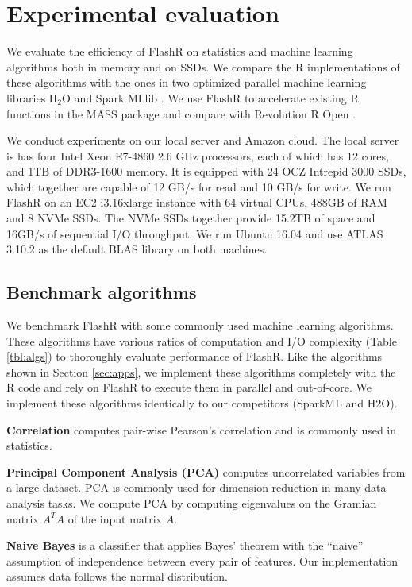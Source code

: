 \section{Experimental evaluation}
We evaluate the efficiency of FlashR on statistics and machine learning
algorithms both in memory and on SSDs. We compare the R implementations of
these algorithms with the ones in two optimized parallel machine learning
libraries H$_2$O \cite{h2o} and Spark MLlib \cite{mllib}. We use FlashR
to accelerate existing R functions in the MASS package and compare with
Revolution R Open \cite{rro}.

We conduct experiments on our local server and Amazon cloud. The local server
is has four Intel Xeon E7-4860 2.6 GHz processors,
each of which has 12 cores, and 1TB of DDR3-1600 memory. It is equipped
with 24 OCZ Intrepid 3000 SSDs, which together are capable of 12 GB/s for read
and 10 GB/s for write. We run FlashR on an EC2 i3.16xlarge instance
with 64 virtual CPUs, 488GB of RAM and 8 NVMe SSDs. The NVMe SSDs together
provide 15.2TB of space and 16GB/s of sequential I/O throughput.
We run Ubuntu 16.04 and use ATLAS 3.10.2 as the default BLAS library on both
machines.

\subsection{Benchmark algorithms}\label{benchalg}
We benchmark FlashR with some commonly used machine learning algorithms.
These algorithms have various ratios of computation and I/O complexity
(Table \ref{tbl:algs}) to thoroughly evaluate performance of FlashR.
Like the algorithms
shown in Section \ref{sec:apps}, we implement these algorithms completely with
the R code and rely on FlashR to execute them in parallel and out-of-core.
We implement these algorithms identically to our competitors (SparkML and H2O). 

\noindent \textbf{Correlation} computes pair-wise Pearson's correlation
\cite{cor} and is commonly used in statistics.

\noindent \textbf{Principal Component Analysis (PCA)} computes uncorrelated
variables from a large dataset. PCA is commonly used for dimension reduction
in many data analysis tasks. We compute PCA by computing eigenvalues on the Gramian
matrix $A^T A$ of the input matrix $A$.

\noindent \textbf{Naive Bayes} is a classifier that applies Bayes' theorem
with the ``naive'' assumption of independence between every pair of features.
Our implementation assumes data follows the normal distribution.

